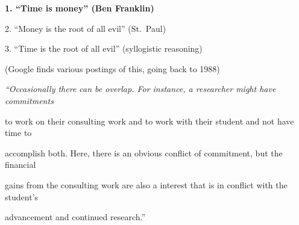 \documentclass[portrait,11pt]{seminar}
\begin{document}




\es\bs
{
\bf
1. ``Time is money'' (Ben Franklin)

2. ``Money is the root of all evil'' (St.\ Paul)

3. ``Time is the root of all evil'' (syllogistic reasoning)
}

\medskip

\vspace{5mm}

(Google finds various postings of this, going back to 1988)


\es \bs

{\it ``Occasionally there can be overlap. For instance, a researcher might have commitments

to work on their consulting work and to work with their student and not have time to

accomplish both. Here, there is an obvious conflict of commitment, but the financial

gains from the consulting work are also a interest that is in conflict with the student’s

advancement and continued research.''}
 
\end{document}
